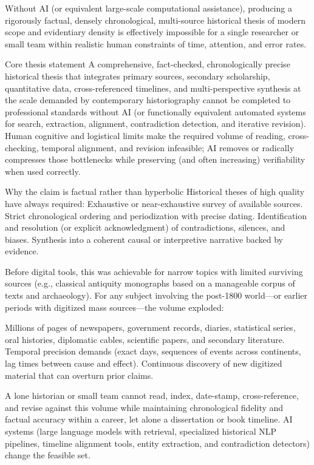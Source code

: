 Without AI (or equivalent large-scale computational assistance), producing a rigorously factual, densely chronological, multi-source historical thesis of modern scope and evidentiary density is effectively impossible for a single researcher or small team within realistic human constraints of time, attention, and error rates.

Core thesis statement
A comprehensive, fact-checked, chronologically precise historical thesis that integrates primary sources, secondary scholarship, quantitative data, cross-referenced timelines, and multi-perspective synthesis at the scale demanded by contemporary historiography cannot be completed to professional standards without AI (or functionally equivalent automated systems for search, extraction, alignment, contradiction detection, and iterative revision). Human cognitive and logistical limits make the required volume of reading, cross-checking, temporal alignment, and revision infeasible; AI removes or radically compresses those bottlenecks while preserving (and often increasing) verifiability when used correctly.

Why the claim is factual rather than hyperbolic
Historical theses of high quality have always required:
Exhaustive or near-exhaustive survey of available sources.
Strict chronological ordering and periodization with precise dating.
Identification and resolution (or explicit acknowledgment) of contradictions, silences, and biases.
Synthesis into a coherent causal or interpretive narrative backed by evidence.

Before digital tools, this was achievable for narrow topics with limited surviving sources (e.g., classical antiquity monographs based on a manageable corpus of texts and archaeology). For any subject involving the post-1800 world—or earlier periods with digitized mass sources—the volume exploded:

Millions of pages of newspapers, government records, diaries, statistical series, oral histories, diplomatic cables, scientific papers, and secondary literature.
Temporal precision demands (exact days, sequences of events across continents, lag times between cause and effect).
Continuous discovery of new digitized material that can overturn prior claims.

A lone historian or small team cannot read, index, date-stamp, cross-reference, and revise against this volume while maintaining chronological fidelity and factual accuracy within a career, let alone a dissertation or book timeline. AI systems (large language models with retrieval, specialized historical NLP pipelines, timeline alignment tools, entity extraction, and contradiction detectors) change the feasible set.

